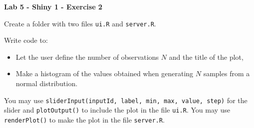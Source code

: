 \documentclass[letterpaper, 12pt]{article}
\begin{document}
\begin{center}
\textbf{\Large{Lab 5 - Shiny 1 - Exercise 2}}
\end{center}

\vspace{2em}

Create a folder with two files \verb|ui.R| and \verb|server.R|.

\vspace{1em}

Write code to:
\begin{itemize}
	\item Let the user define the number of observations $N$ and the title of the plot,
	\item Make a histogram of the values obtained when generating $N$ samples from a normal distribution.
\end{itemize}

\vspace{1em}

You may use \verb|sliderInput(inputId, label, min, max, value, step)| for the slider and \verb|plotOutput()| to include the plot in the file \verb|ui.R|. You may use \verb|renderPlot()| to make the plot in the file \verb|server.R|.
 
\end{document}
